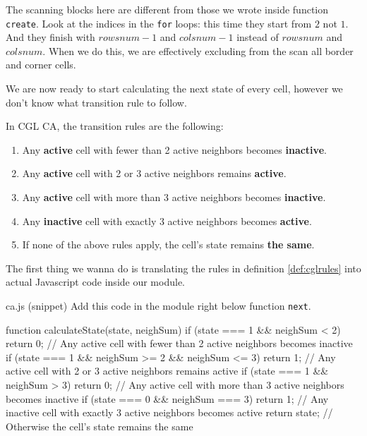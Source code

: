 The scanning blocks here are different from those we wrote inside function \texttt{create}.
Look at the indices in the \texttt{for} loops: this time they start from
$2$ not $1$. And they finish with $rowsnum - 1$ and $colsnum - 1$ instead of $rowsnum$ and $colsnum$.
When we do this, we are effectively excluding from the scan all border and corner cells.

We are now ready to start calculating the next state of every cell, however we don't know what
transition rule to follow.

\begin{definition}
\label{def:cglrules}
In CGL CA, the transition rules are the following:
\begin{enumerate}
\item Any \textbf{active} cell with fewer than 2 active neighbors becomes \textbf{inactive}.
\item Any \textbf{active} cell with 2 or 3 active neighbors remains \textbf{active}.
\item Any \textbf{active} cell with more than 3 active neighbors becomes \textbf{inactive}.
\item Any \textbf{inactive} cell with exactly 3 active neighbors becomes \textbf{active}.
\item If none of the above rules apply, the cell's state remains \textbf{the same}.
\end{enumerate}
\end{definition}

The first thing we wanna do is translating the rules in definition \ref{def:cglrules} into
actual Javascript code inside our module.

\begin{programcode}{ca.js (snippet)}
Add this code in the module right below function \texttt{next}.
\begin{code}
function calculateState(state, neighSum) {
  if (state === 1 && neighSum < 2) {
    return 0; // Any active cell with fewer than 2 active neighbors becomes inactive
  }
  if (state === 1 && neighSum >= 2 && neighSum <= 3) {
    return 1; // Any active cell with 2 or 3 active neighbors remains active
  }
  if (state === 1 && neighSum > 3) {
    return 0; // Any active cell with more than 3 active neighbors becomes inactive
  }
  if (state === 0 && neighSum === 3) {
    return 1; // Any inactive cell with exactly 3 active neighbors becomes active
  }
  return state; // Otherwise the cell's state remains the same
}
\end{code}
\end{programcode}

